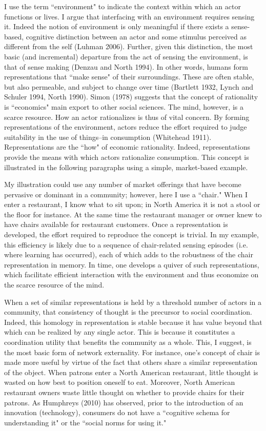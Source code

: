 I use the term ``environment" to indicate the context within which an actor functions or lives. I argue that interfacing with an environment requires sensing it. Indeed the notion of environment is only meaningful if there exists a sense-based, cognitive distinction between an actor and some stimulus perceived as different from the self (Luhman 2006). Further, given this distinction, the most basic (and incremental) departure from the act of sensing the environment, is that of sense making (Denzau and North 1994). In other words, humans form representations that ``make sense" of their surroundings. These are often stable, but also permeable, and subject to change over time (Bartlett 1932, Lynch and Schuler 1994, North 1990).
Simon (1978) suggests that the concept of rationality is ``economics" main export to other social sciences. The mind, however, is a scarce resource. How an actor rationalizes is thus of vital concern. By forming representations of the environment, actors reduce the effort required to judge suitability in the use of things--in consumption (Whitehead 1911). Representations are the ``how" of economic rationality. Indeed, representations provide the means with which actors rationalize consumption. This concept is illustrated in the following paragraphs using a simple, market-based example. 

My illustration could use any number of market offerings that have become pervasive or dominant in a community; however, here I use a ``chair." When I enter a restaurant, I know what to sit upon; in North America it is not a stool or the floor for instance. At the same time the restaurant manager or owner knew to have chairs available for restaurant customers. Once a representation is developed, the effort required to reproduce the concept is trivial. In my example, this efficiency is likely due to a sequence of chair-related sensing episodes (i.e. where learning has occurred), each of which adds to the robustness of the chair representation in memory. In time, one develops a quiver of such representations, which facilitate efficient interaction with the environment  and thus economize on the scarce resource of the mind. 

When a set of similar representations is held by a threshold number of actors in a community, that consistency of thought is the precursor to social coordination. Indeed, this homology in representation is stable because it has value beyond that which can be realized by any single actor. This is because it constitutes a coordination utility that benefits the community as a whole. This, I suggest, is the most basic form of network externality. For instance, one's concept of chair is made more useful by virtue of the fact that others share a similar representation of the object. When patrons enter a North American restaurant, little thought is wasted on how best to position oneself to eat. Moreover, North American restaurant owners waste little thought on whether to provide chairs for their patrons. As Humphreys (2010) has observed, prior to the introduction of an innovation (technology), consumers do not have a ``cognitive schema for understanding it" or the ``social norms for using it." 

